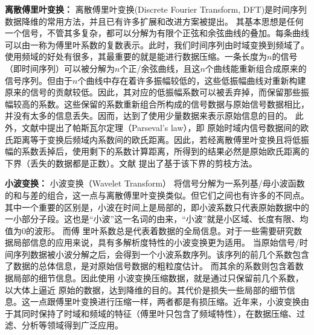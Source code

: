 \textbf{离散傅里叶变换：}
离散傅里叶变换(Discrete Fourier Transform, DFT)\cite{DFT}是时间序列数据降维的常用方法，并且已有许多扩展和改进方案被提出\cite{fastDFT,rafiei1997similarity,rafiei1999on}。
其基本思想是任何一个信号，不管其多复杂，都可以分解为有限个正弦和余弦曲线的叠加。每条曲线可以由一称为傅里叶系数的复数表示\cite{Shatkay1995The}。此时，我们时间序列由时域变换到频域了。使用频域的好处有很多，其最重要的就是能进行数据压缩。一条长度为$n$的信号（即时间序列）可以被分解为$n$个正/余弦曲线，且这$n$个曲线能重新组合成原来的信号序列。但由于$n$个曲线中存在着许多振幅较低的，这些低振幅曲线对重新构建原来的信号的贡献较低。因此，其对应的低振幅系数可以被丢弃掉，而保留那些振幅较高的系数。这些保留的系数重新组合所构成的信号数据与原始信号数据相比，并没有太多的信息丢失。因而，达到了使用少量数据来表示原始信息的目的。
此外，文献\cite{Shatkay1995The}中提出了帕斯瓦尔定理（Parseval's law），即
原始时域内信号数据间的欧氏距离等于变换后频域内系数间的欧氏距离。因此，若经离散傅里叶变换且将低振幅的系数丢掉后，使用剩下的系数计算距离，所得到的结果必然是原始欧氏距离的下界（丢失的数据都是正数）。文献 \cite{KeoghDimReduction}提出了基于该下界的剪枝方法。


\textbf{小波变换：}
小波变换（Wavelet Transform） 将信号分解为一系列基/母小波函数的和与差的组合，这一点与离散傅里叶变换类似。但它们之间也有许多的不同点。其中一个重要的区别是，小波在时间上是局部的，即小波系数只代表原始数据中的一小部分子段。这也是“小波”这一名词的由来，“小波”就是小区域、长度有限、均值为0的波形。
而傅 里叶系数总是代表着数据的全局信息。对于一些需要研究数据局部信息的应用来说，具有多解析度特性的小波变换更为适用。
%
当原始信号/时间序列数据被小波分解之后，会得到一个小波系数序列。该序列的前几个系数包含了数据的总体信息，是对原始信号数据的粗粒度估计。
而其余的系数则包含着数据局部的细节信息。因此使用 小波变换压缩数据，就是通过只保留前几个系数，以大体上逼近 原始的数据，达到降维的目的。其代价是损失一些局部的细节信息。这一点跟傅里叶变换进行压缩一样，两者都是有损压缩。近年来，小波变换由于其同时保持了时域和频域的特征（傅里叶只包含了频域特性），在数据压缩、过滤、分析等领域得到广泛应用。

